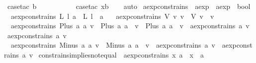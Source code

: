 \begin{isabellebody}
\ {\isacharparenleft}case{\isacharunderscore}tac\ b{\isacharparenright}\isanewline
\ \ \ \ \ \ \ \ \ \isamarkupfalse%
\ {\isacharparenleft}case{\isacharunderscore}tac\ x{}b{\isacharparenright}\isanewline
\ \ \isamarkupfalse%
\ auto%
\endisatagproof
{\isafoldproof}%
%
\isadelimproof
\isanewline
%
\endisadelimproof
\isanewline
{}\isamarkupfalse%
\ aexp{\isacharunderscore}constrains\ {\isacharcolon}{\isacharcolon}\ {\isachardoublequoteopen}aexp\ {\isasymRightarrow}\ aexp\ {\isasymRightarrow}\ bool{\isachardoublequoteclose}\ \isanewline
\ \ {\isachardoublequoteopen}aexp{\isacharunderscore}constrains\ {\isacharparenleft}L\ l{\isacharparenright}\ a\ {\isacharequal}\ {\isacharparenleft}L\ l\ {\isacharequal}\ a{\isacharparenright}{\isachardoublequoteclose}\ {\isacharbar}\isanewline
\ \ {\isachardoublequoteopen}aexp{\isacharunderscore}constrains\ {\isacharparenleft}V\ v{\isacharparenright}\ v{\isacharprime}\ {\isacharequal}\ {\isacharparenleft}V\ v\ {\isacharequal}\ v{\isacharprime}{\isacharparenright}{\isachardoublequoteclose}\ {\isacharbar}\isanewline
\ \ {\isachardoublequoteopen}aexp{\isacharunderscore}constrains\ {\isacharparenleft}Plus\ a{}\ a{}{\isacharparenright}\ v\ {\isacharequal}\ {\isacharparenleft}{\isacharparenleft}Plus\ a{}\ a{}{\isacharparenright}\ {\isacharequal}\ v\ {\isasymor}\ {\isacharparenleft}Plus\ a{}\ a{}{\isacharparenright}\ {\isacharequal}\ v\ {\isasymor}\ {\isacharparenleft}aexp{\isacharunderscore}constrains\ a{}\ v\ {\isasymor}\ aexp{\isacharunderscore}constrains\ a{}\ v{\isacharparenright}{\isacharparenright}{\isachardoublequoteclose}\ {\isacharbar}\isanewline
\ \ {\isachardoublequoteopen}aexp{\isacharunderscore}constrains\ {\isacharparenleft}Minus\ a{}\ a{}{\isacharparenright}\ v\ {\isacharequal}\ {\isacharparenleft}{\isacharparenleft}Minus\ a{}\ a{}{\isacharparenright}\ {\isacharequal}\ v\ {\isasymor}\ {\isacharparenleft}aexp{\isacharunderscore}constrains\ a{}\ v\ {\isasymor}\ aexp{\isacharunderscore}constrains\ a{}\ v{\isacharparenright}{\isacharparenright}{\isachardoublequoteclose}\isanewline
\isanewline
{}\isamarkupfalse%
\ constrains{\isacharunderscore}implies{\isacharunderscore}not{\isacharunderscore}equal{\isacharcolon}\ {\isachardoublequoteopen}{\isasymnot}\ aexp{\isacharunderscore}constrains\ x\ a\ {\isasymLongrightarrow}\ x\ {\isasymnoteq}\ a{\isachardoublequoteclose}\isanewline

\end{isabellebody}
